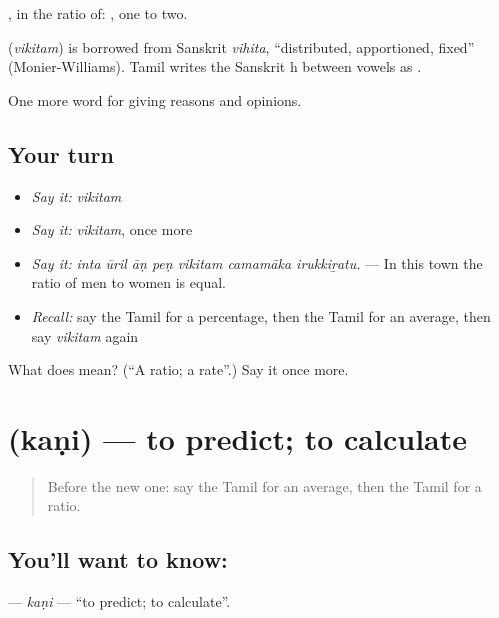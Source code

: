  , in the ratio of:    , one to two.

\begin{cousinweb}
\textbf{} (\emph{vikitam}) is borrowed from Sanskrit \emph{vihita}, \textquotedblleft{}distributed, apportioned, fixed\textquotedblright{} (Monier-Williams). Tamil writes the Sanskrit h between vowels as .
\end{cousinweb}

\begin{grammarlens}[title={What you've built}]
One more word for giving reasons and opinions.
\end{grammarlens}

\subsection*{Your turn}
\begin{itemize}
\raggedright
  \item \emph{Say it:} \emph{vikitam}
  \item \emph{Say it:} \emph{vikitam}, once more
  \item \emph{Say it:} \emph{inta ūril āṇ peṇ vikitam camamāka irukkiṟatu.} — In this town the ratio of men to women is equal.
  \item \emph{Recall:} say the Tamil for a percentage, then the Tamil for an average, then say \emph{vikitam} again
\end{itemize}

\begin{tcolorbox}[breakable,colback=teal!4,colframe=teal!35!black,title={Before you move on}]
What does  mean? (\textquotedblleft{}A ratio; a rate\textquotedblright{}.) Say it once more.
\end{tcolorbox}
\section[\texorpdfstring{\ta{கணி} (kaṇi)}{கணி (kaṇi)}]{ (kaṇi) — to predict; to calculate}

\label{lesson:TA-C363-kani}



\begin{quote}
Before the new one: say the Tamil for an average, then the Tamil for a ratio.
\end{quote}

\subsection*{You'll want to know: }
\textbf{} — \emph{kaṇi} — \textquotedblleft{}to predict; to calculate\textquotedblright{}.

